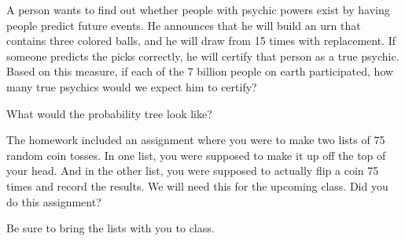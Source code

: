 \documentclass{ximera}
\begin{document}
\begin{question}
A person wants to find out whether people with psychic powers exist by having people predict future events. He announces that he will build an urn that contains three colored balls, and he will draw from 15 times with replacement. If someone predicts the picks correctly, he will certify that person as a true psychic. Based on this measure, if each of the 7 billion people on earth participated, how many true psychics would we expect him to certify?
  \begin{solution}
    \begin{multiple-choice}
    \end{multiple-choice}
    \begin{hint}
    What would the probability tree look like?
    \end{hint}
  \end{solution}
\end{question}

\begin{question}
The homework included an assignment where you were to make two lists of 75 random coin tosses. In one list, you were supposed to make it up off the top of your head. And in the other list, you were supposed to actually flip a coin 75 times and record the results. We will need this for the upcoming class. Did you do this assignment? 
  \begin{solution}
    \begin{multiple-choice}
    \end{multiple-choice}
    Be sure to bring the lists with you to class.
  \end{solution}
\end{question}
\end{document}
